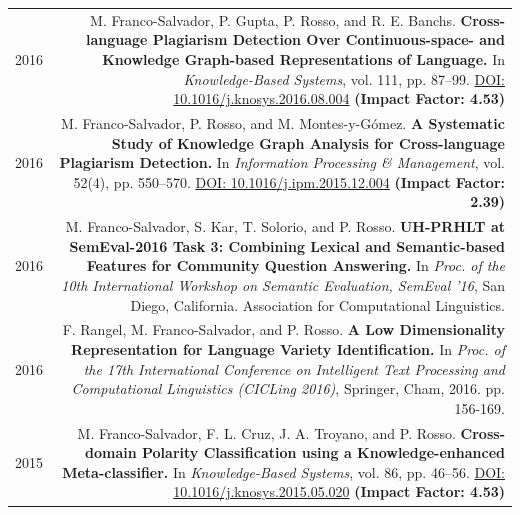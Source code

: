 \documentclass[10pt]{article}
\begin{document}
\begin{tabular}{L!{\VRule}R}
	2016&M. Franco-Salvador, P. Gupta, P. Rosso, and R. E. Banchs. \textbf{Cross-language Plagiarism Detection Over Continuous-space- and Knowledge Graph-based Representations of Language.}
	In \emph{Knowledge-Based Systems}, vol. 111, pp. 87--99. \href{http://dx.doi.org/10.1016/j.knosys.2016.08.004}{DOI: 10.1016/j.knosys.2016.08.004} \textbf{(Impact Factor: 4.53)} \vspace{5pt}\\
	2016&M. Franco-Salvador, P. Rosso, and M. Montes-y-G{\'o}mez. \textbf{A Systematic Study of Knowledge Graph Analysis for Cross-language Plagiarism Detection.}
	In \emph{Information Processing \& Management}, vol. 52(4), pp. 550--570. \href{http://dx.doi.org/10.1016/j.ipm.2015.12.004}{DOI: 10.1016/j.ipm.2015.12.004} \textbf{(Impact Factor: 2.39)} \vspace{5pt}\\
	2016 &M. Franco-Salvador, S. Kar, T. Solorio, and P. Rosso. \textbf{UH-PRHLT at SemEval-2016 Task 3: Combining Lexical and Semantic-based Features for Community Question Answering.} In \emph{Proc. of the 10th International Workshop on Semantic Evaluation, SemEval '16}, San Diego, California. Association for Computational Linguistics. \vspace{5pt}\\
	2016 &F. Rangel, M. Franco-Salvador, and P. Rosso. \textbf{A Low Dimensionality Representation for Language Variety Identification.} In \emph{Proc.  of  the  17th  International Conference on Intelligent Text Processing and Computational Linguistics (CICLing 2016)}, Springer, Cham, 2016. pp. 156-169. \vspace{5pt}\\
	2015&M. Franco-Salvador, F. L. Cruz, J. A. Troyano, and P. Rosso. \textbf{Cross-domain Polarity Classification using a Knowledge-enhanced Meta-classifier.}
	In \emph{Knowledge-Based Systems}, vol. 86, pp. 46--56. \href{http://dx.doi.org/10.1016/j.knosys.2015.05.020}{DOI: 10.1016/j.knosys.2015.05.020} \textbf{(Impact Factor: 4.53)} \vspace{5pt}\\
\end{tabular}
\end{document}
